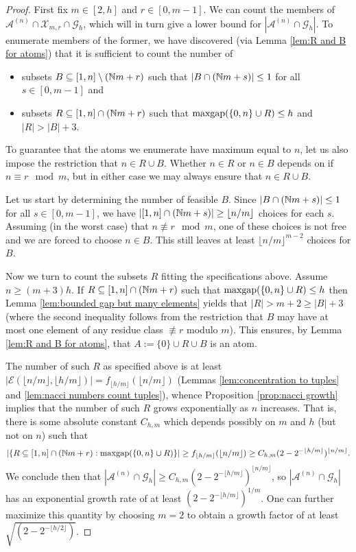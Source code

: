 \begin{proof}
First fix $m\in [2,h]$ and $r\in [0,m-1]$.
We can count the members of $\mathcal{A}^{(n)}\cap \mathcal{X}_{m,r}\cap \mathcal{G}_h$, which will in turn give a lower bound for $|\mathcal{A}^{(n)}\cap \mathcal{G}_h|$.
To enumerate members of the former, we have discovered (via Lemma \ref{lem:R and B for atoms}) that it is sufficient to count the number of 
\begin{itemize}
	\item subsets $B\subseteq [1,n]\setminus(\mathbb{N} m + r)$ such that $|B\cap (\mathbb{N} m + s)| \le 1$ for all $s\in [0,m-1]$ and
	\item subsets $R\subseteq [1,n]\cap (\mathbb{N} m +r)$ such that $\operatorname{maxgap}(\{0,n\} \cup R) \le h$ and $|R| > |B|+3$.
\end{itemize}
To guarantee that the atoms we enumerate have maximum equal to $n$, let us also impose the restriction that $n\in R\cup B$.
Whether $n\in R$ or $n\in B$ depends on if $n\equiv r \mod m$, but in either case we may always ensure that $n\in R\cup B$.

Let us start by determining the number of feasible $B$.
Since $|B\cap (\mathbb{N} m + s)|\le 1$ for all $s\in [0,m-1]$, we have $|[1,n]\cap (\mathbb{N} m + s)| \ge \lfloor n/m \rfloor$ choices for each $s$.
Assuming (in the worst case) that $n\not\equiv r\mod m$, one of these choices is not free and we are forced to choose $n\in B$.
This still leaves at least $\lfloor n/m \rfloor ^{m-2}$ choices for $B$.

Now we turn to count the subsets $R$ fitting the specifications above.
Assume $n \ge (m+3)h$.
If $R\subseteq [1,n]\cap (\mathbb{N} m + r)$ such that $\operatorname{maxgap}(\{0,n\}\cup R)\le h$ then Lemma \ref{lem:bounded gap but many elements} yields that $|R| > m+2 \ge |B| + 3$ (where the second inequality follows from the restriction that $B$ may have at most one element of any residue class $\not\equiv r$ modulo $m$).
This ensures, by Lemma \ref{lem:R and B for atoms}, that $A:= \{0\}\cup R \cup B$ is an atom.  

The number of such $R$ as specified above is at least $|\mathcal{E}(\lfloor n/m \rfloor,\lfloor h/m\rfloor)| = f_{\lfloor h/m \rfloor}(\lfloor n/m \rfloor)$ (Lemmas \ref{lem:concentration to tuples} and \ref{lem:nacci numbers count tuples}), whence Proposition \ref{prop:nacci growth} implies that the number of such $R$ grows exponentially as $n$ increases.
That is, there is some absolute constant $C_{h,m}$ which depends possibly on $m$ and $h$ (but not on $n$) such that 
\[|\{R\subseteq [1,n]\cap (\mathbb{N} m +r): \operatorname{maxgap}(\{0,n\}\cup R)\}| \ge f_{\lfloor h/m \rfloor}(\lfloor n/m\rfloor) \ge C_{h,m} (2-2^{-\lfloor h/m\rfloor})^{\lfloor n/m \rfloor}. \]
We conclude then that $|\mathcal{A}^{(n)}\cap \mathcal{G}_h| \ge C_{h,m}(2-2^{-\lfloor h/m \rfloor})^{\lfloor n/m \rfloor}$, so $|\mathcal{A}^{(n)}\cap \mathcal{G}_h|$ has an exponential growth rate of at least $(2-2^{-\lfloor h/m\rfloor})^{1/m}$.
One can further maximize this quantity by choosing $m=2$ to obtain a growth factor of at least $\sqrt{(2-2^{-\lfloor h/2 \rfloor})}$.
\end{proof}

